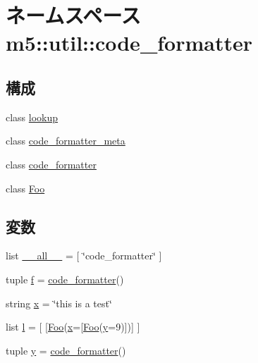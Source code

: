 \hypertarget{namespacem5_1_1util_1_1code__formatter}{
\section{ネームスペース m5::util::code\_\-formatter}
\label{namespacem5_1_1util_1_1code__formatter}
}
\subsection*{構成}
\begin{DoxyCompactItemize}
\item 
class \hyperlink{classm5_1_1util_1_1code__formatter_1_1lookup}{lookup}
\item 
class \hyperlink{classm5_1_1util_1_1code__formatter_1_1code__formatter__meta}{code\_\-formatter\_\-meta}
\item 
class \hyperlink{classm5_1_1util_1_1code__formatter_1_1code__formatter}{code\_\-formatter}
\item 
class \hyperlink{classm5_1_1util_1_1code__formatter_1_1Foo}{Foo}
\end{DoxyCompactItemize}
\subsection*{変数}
\begin{DoxyCompactItemize}
\item 
list \hyperlink{namespacem5_1_1util_1_1code__formatter_aa4a022e6ddacd362b83964da5cc5d044}{\_\-\_\-all\_\-\_\-} = \mbox{[} \char`\"{}code\_\-formatter\char`\"{} \mbox{]}
\item 
tuple \hyperlink{namespacem5_1_1util_1_1code__formatter_a85d897846bb64fe74a8ce36c2365e3b8}{f} = \hyperlink{classm5_1_1util_1_1code__formatter_1_1code__formatter}{code\_\-formatter}()
\item 
string \hyperlink{namespacem5_1_1util_1_1code__formatter_a1975cadbf21ae7aae255572d018b16cd}{x} = \char`\"{}this is a test\char`\"{}
\item 
list \hyperlink{namespacem5_1_1util_1_1code__formatter_ae444945db5297bdd9e5c43355c9c76a1}{l} = \mbox{[} \mbox{[}\hyperlink{classm5_1_1util_1_1code__formatter_1_1Foo}{Foo}(\hyperlink{namespacem5_1_1util_1_1code__formatter_a1975cadbf21ae7aae255572d018b16cd}{x}=\mbox{[}\hyperlink{classm5_1_1util_1_1code__formatter_1_1Foo}{Foo}(\hyperlink{namespacem5_1_1util_1_1code__formatter_addbecca6e1a6301f3c92a77b235c1a51}{y}=9)\mbox{]})\mbox{]} \mbox{]}
\item 
tuple \hyperlink{namespacem5_1_1util_1_1code__formatter_addbecca6e1a6301f3c92a77b235c1a51}{y} = \hyperlink{classm5_1_1util_1_1code__formatter_1_1code__formatter}{code\_\-formatter}()
\end{DoxyCompactItemize}


